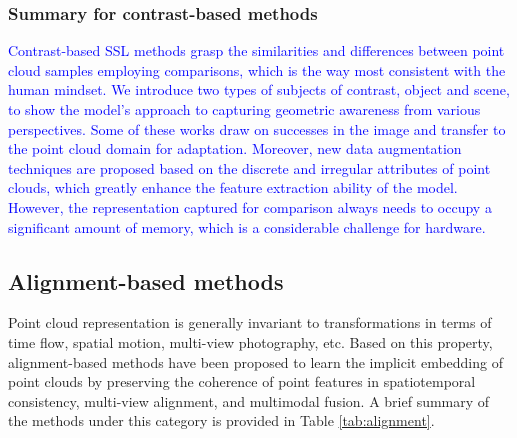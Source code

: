 \documentclass[a4paper,fleqn]{cas-dc}
\begin{document}
\subsubsection{Summary for contrast-based methods}
\textcolor{blue}{
Contrast-based SSL methods grasp the similarities and differences between point cloud samples employing comparisons, which is the way most consistent with the human mindset. We introduce two types of subjects of contrast, object and scene, to show the model's approach to capturing geometric awareness from various perspectives. Some of these works \citep{sanghi2020info3d,hou2021exploring,lal2021coconets} draw on successes in the image and transfer to the point cloud domain for adaptation. Moreover, new data augmentation techniques are proposed based on the discrete and irregular attributes of point clouds, which greatly enhance the feature extraction ability of the model. However, the representation captured for comparison always needs to occupy a significant amount of memory, which is a considerable challenge for hardware.}





\subsection{Alignment-based methods}
Point cloud representation is generally invariant to transformations in terms of time flow, spatial motion, multi-view photography, etc. Based on this property, alignment-based methods have been proposed to learn the implicit embedding of point clouds by preserving the coherence of point features in spatiotemporal consistency, multi-view alignment, and multimodal fusion. A brief summary of the methods under this category is provided in Table \ref{tab:alignment}.
\end{document}
